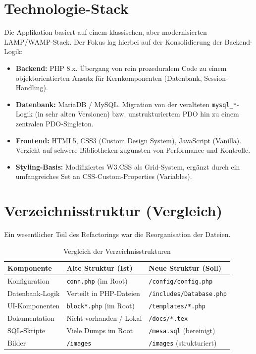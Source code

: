 \documentclass[11pt,
a4paper,
numbers=nonperiod,
footsepline,
oneside,
numbers=noenddot,
bibliography=totoc
]{scrreprt}
\begin{document}
\section{Technologie-Stack}
Die Applikation basiert auf einem klassischen, aber modernisierten LAMP/WAMP-Stack. Der Fokus lag hierbei auf der Konsolidierung der Backend-Logik:
\begin{itemize}
    \item \textbf{Backend:} PHP 8.x. Übergang von rein prozeduralem Code zu einem objektorientierten Ansatz für Kernkomponenten (Datenbank, Session-Handling).
    \item \textbf{Datenbank:} MariaDB / MySQL. Migration von der veralteten \texttt{mysql\_*}-Logik (in sehr alten Versionen) bzw. unstrukturiertem PDO hin zu einem zentralen PDO-Singleton.
    \item \textbf{Frontend:} HTML5, CSS3 (Custom Design System), JavaScript (Vanilla). Verzicht auf schwere Bibliotheken zugunsten von Performance und Kontrolle.
    \item \textbf{Styling-Basis:} Modifiziertes W3.CSS als Grid-System, ergänzt durch ein umfangreiches Set an CSS-Custom-Properties (Variables).
\end{itemize}

\section{Verzeichnisstruktur (Vergleich)}
Ein wesentlicher Teil des Refactorings war die Reorganisation der Dateien.

\begin{table}[H]
    \centering
    \caption{Vergleich der Verzeichnisstrukturen}
    \begin{tabular}{lll}
        \toprule
        \textbf{Komponente} & \textbf{Alte Struktur (Ist)} & \textbf{Neue Struktur (Soll)} \\
        \midrule
        Konfiguration & \texttt{conn.php} (im Root) & \texttt{/config/config.php} \\
        Datenbank-Logik & Verteilt in PHP-Dateien & \texttt{/includes/Database.php} \\
        UI-Komponenten & \texttt{block*.php} (im Root) & \texttt{/templates/*.php} \\
        Dokumentation & Nicht vorhanden / Lokal & \texttt{/docs/*.tex} \\
        SQL-Skripte & Viele Dumps im Root & \texttt{/mesa.sql} (bereinigt) \\
        Bilder & \texttt{/images} & \texttt{/images} (strukturiert) \\
        \bottomrule
    \end{tabular}
\end{table}
\end{document}
